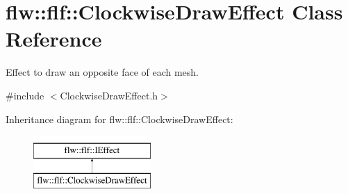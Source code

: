 \hypertarget{classflw_1_1flf_1_1ClockwiseDrawEffect}{}\section{flw\+:\+:flf\+:\+:Clockwise\+Draw\+Effect Class Reference}
\label{classflw_1_1flf_1_1ClockwiseDrawEffect}


Effect to draw an opposite face of each mesh.  




{\ttfamily \#include $<$Clockwise\+Draw\+Effect.\+h$>$}

Inheritance diagram for flw\+:\+:flf\+:\+:Clockwise\+Draw\+Effect\+:\begin{figure}[H]
\begin{center}
\leavevmode
\includegraphics[height=2.000000cm]{classflw_1_1flf_1_1ClockwiseDrawEffect}
\end{center}
\end{figure}

